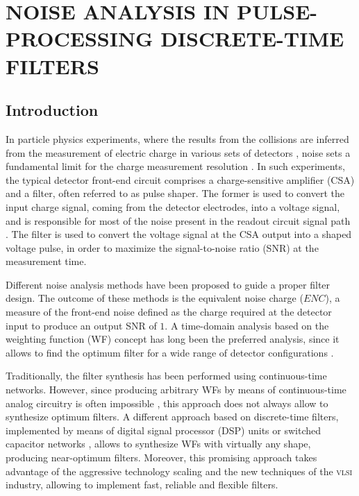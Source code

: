 \chapter{NOISE ANALYSIS IN PULSE-PROCESSING DISCRETE-TIME FILTERS\footnotemark}
\label{chapter:theoretical}
\section{Introduction}
In particle physics experiments, where the results from the collisions are inferred from the measurement of electric charge in various sets of detectors \citep{gatti101,radeka101}, noise sets a fundamental limit for the charge measurement resolution \citep{degeronimo102}. In such experiments, the typical detector \mbox{front-end} circuit comprises a \mbox{charge-sensitive} amplifier (CSA) and a filter, often referred to as pulse shaper. The former is used to convert the input charge signal, coming from the detector electrodes, into a voltage signal, and is responsible for most of the noise present in the readout circuit signal path \citep{degeronimo101,degeronimo102}. The filter is used to convert the voltage signal at the CSA output into a shaped voltage pulse, in order to maximize the \mbox{signal-to-noise} ratio (SNR) at the measurement time.

Different noise analysis methods have been proposed to guide a proper filter design. The outcome of these methods is the equivalent noise charge ($\mathit{ENC}$), a measure of the \mbox{front-end} noise defined as the charge required at the detector input to produce an output SNR  of $1$. A \mbox{time-domain} analysis based on the weighting function (WF) concept \citep{radeka101, goulding101} has long been the preferred analysis, since it allows to find the optimum filter for a wide range of detector configurations \citep{radeka104,geraci101, gatti102,pullia103,pullia105}.

Traditionally, the filter synthesis has been performed using \mbox{continuous-time} networks. However, since producing arbitrary WFs by means of \mbox{continuous-time} analog circuitry is often impossible \citep{gatti102}, this approach does not always allow to synthesize optimum filters. A different approach based on \mbox{discrete-time} filters, implemented by means of digital signal processor (DSP) units \citep{geraci103,sampietro101,jordanov101} or switched capacitor networks \citep{porro101,fiorini101,abusleme101}, allows to synthesize WFs with virtually any shape, producing \mbox{near-optimum} filters. Moreover, this promising approach takes advantage of the aggressive technology scaling and the new techniques of the \textsc{vlsi} industry, allowing to implement fast, reliable and flexible filters.

